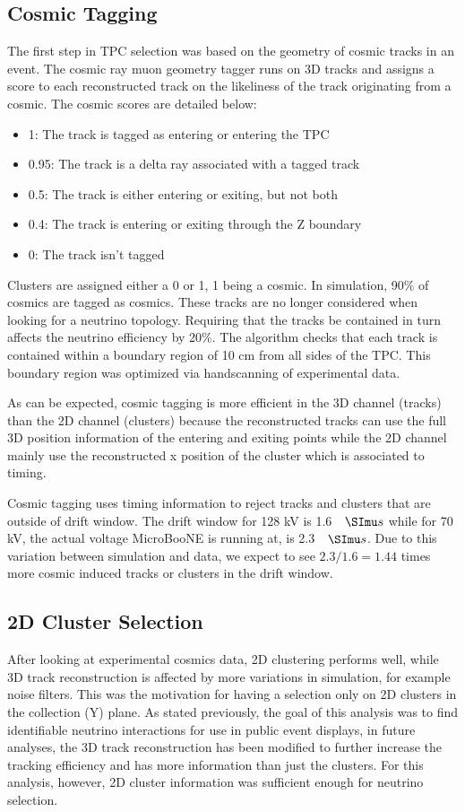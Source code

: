 \subsection{Cosmic Tagging}
The first step in TPC selection was based on the geometry of cosmic tracks in an event. The cosmic ray muon geometry tagger runs on 3D tracks and assigns a score to each reconstructed track on the likeliness of the track originating from a cosmic. The cosmic scores are detailed below:
\begin{itemize}
\item 1: The track is tagged as entering or entering the TPC
\item 0.95: The track is a delta ray associated with a tagged track
\item 0.5: The track is either entering or exiting, but not both
\item 0.4: The track is entering or exiting through the Z boundary
\item 0: The track isn't tagged
\end{itemize}
Clusters are assigned either a 0 or 1, 1 being a cosmic. In simulation, 90\% of cosmics are tagged as cosmics. These tracks are no longer considered when looking for a neutrino topology. Requiring that the tracks be contained in turn affects the neutrino efficiency by 20\%. The algorithm checks that each track is contained within a boundary region of 10 cm from all sides of the TPC. This boundary region was optimized via handscanning of experimental data.

As can be expected, cosmic tagging is more efficient in the 3D channel (tracks) than the 2D channel (clusters) because the reconstructed tracks can use the full 3D position information of the entering and exiting points while the 2D channel mainly use the reconstructed x position of the cluster which is associated to timing. 

Cosmic tagging uses timing information to reject tracks and clusters that are outside of drift window. The drift window for 128 kV is 1.6 $\micro s$ while for 70 kV, the actual voltage MicroBooNE is running at, is 2.3 $\micro s$. Due to this variation between simulation and data, we expect to see $2.3/1.6 = 1.44$ times more cosmic induced tracks or clusters in the drift window. 
\subsection{2D Cluster Selection}
After looking at experimental cosmics data, 2D clustering performs well, while 3D track reconstruction is affected by more variations in simulation, for example noise filters. This was the motivation for having a selection only on 2D clusters in the collection (Y) plane. As stated previously, the goal of this analysis was to find identifiable neutrino interactions for use in public event displays, in future analyses, the 3D track reconstruction has been modified to further increase the tracking efficiency and has more information than just the clusters. For this analysis, however, 2D cluster information was sufficient enough for neutrino selection. 
